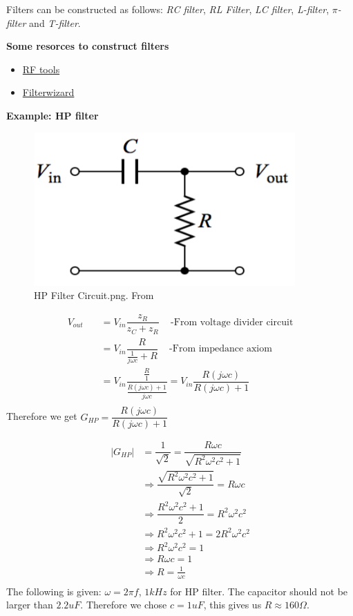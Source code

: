 Filters can be constructed as follows: \newline
\textit{RC filter}, \textit{RL Filter}, \textit{LC filter}, 
\textit{L-filter}, \textit{$\pi$-filter} and \textit{T-filter}.

\newpage
\textbf{Some resorces to construct filters}
\begin{itemize}
    \item \href{https://rf-tools.com/lc-filter/}{RF tools}
    \item \href{https://tools.analog.com/en/filterwizard/}{Filterwizard}
\end{itemize}

\textbf{Example: HP filter}
\begin{figure}[h]
    \centering
    \includegraphics[width=10cm]{image/HP-filter_circuit.png}
    \caption{HP Filter Circuit.png. From \cite{}}
\end{figure}
\begin{align*}
    V_{out} &\quad = V_{in}\dfrac{z_R}{z_C+z_R} \;\;\; 
           \text{ -From voltage divider circuit} \\
           &\quad = V_{in}\dfrac{R}{\frac{1}{j\omega c}+R} \;\;\; \text{ -From impedance axiom} \\
           &\quad = V_{in}\dfrac{\frac{R}{1}}{\frac{R(j\omega c)+1}{j\omega c}} 
           = V_{in}\dfrac{R(j\omega c)}{R(j\omega c)+1}  \\
\end{align*}
Therefore we get $G_{HP}=\dfrac{R(j\omega c)}{R(j\omega c)+1}$

\begin{align*}
|G_{HP}| &=\dfrac{1}{\sqrt{2}}=\dfrac{R\omega c}{\sqrt{R^2\omega^2c^2+1}} \\
         &\Rightarrow \dfrac{\sqrt{R^2\omega^2c^2+1}}{\sqrt{2}}=R\omega c \\
         &\Rightarrow \dfrac{R^2\omega^2c^2+1}{2}=R^2\omega^2c^2 \\
         &\Rightarrow R^2\omega^2c^2+1=2R^2\omega^2c^2 \\
         &\Rightarrow R^2\omega^2c^2=1 \\
         &\Rightarrow R\omega c=1 \\
         &\Rightarrow R=\frac{1}{\omega c} \\
\end{align*}
The following is given: $\omega=2\pi f$, $1kHz$ for HP filter.
The capacitor should not be larger than $2.2uF$.
Therefore we chose $c=1uF$, this gives us $R\approx 160\Omega$.

